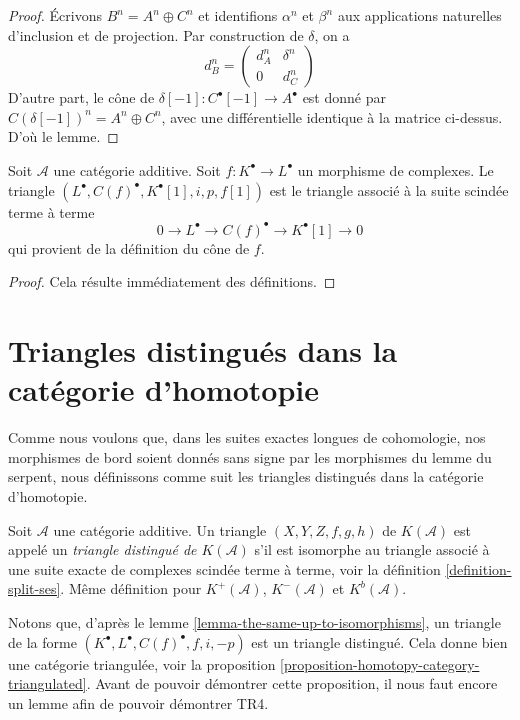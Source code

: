 \begin{proof}
Écrivons $B^n = A^n \oplus C^n$ et identifions $\alpha^n$ et $\beta^n$ aux
applications naturelles d'inclusion et de projection. Par construction de
$\delta$, on a
$$
d_B^n =
\left(
\begin{matrix}
d_A^n & \delta^n \\
0 & d_C^n
\end{matrix}
\right)
$$
D'autre part, le cône de $\delta[-1] : C^\bullet[-1] \to A^\bullet$ est donné
par $C(\delta[-1])^n = A^n \oplus C^n$, avec une différentielle identique à la
matrice ci-dessus. D'où le lemme.
\end{proof}

\begin{lemma}
\label{lemma-rotate-cone}
Soit $\mathcal{A}$ une catégorie additive.
Soit $f : K^\bullet \to L^\bullet$ un morphisme de complexes.
Le triangle $(L^\bullet, C(f)^\bullet, K^\bullet[1], i, p, f[1])$ est le
triangle associé à la suite scindée terme à terme
$$
0 \to L^\bullet \to C(f)^\bullet \to K^\bullet[1] \to 0
$$
qui provient de la définition du cône de $f$.
\end{lemma}

\begin{proof}
Cela résulte immédiatement des définitions.
\end{proof}

\section{Triangles distingués dans la catégorie d'homotopie}
\label{section-homotopy-triangulated}

\noindent
Comme nous voulons que, dans les suites exactes longues de cohomologie, nos
morphismes de bord soient donnés sans signe par les morphismes du lemme du
serpent, nous définissons comme suit les triangles distingués dans la catégorie
d'homotopie.

\begin{definition}
\label{definition-distinguished-triangle}
Soit $\mathcal{A}$ une catégorie additive.
Un triangle $(X, Y, Z, f, g, h)$ de $K(\mathcal{A})$ est appelé un
{\it triangle distingué de $K(\mathcal{A})$} s'il est isomorphe au triangle
associé à une suite exacte de complexes scindée terme à terme, voir la
définition \ref{definition-split-ses}.
Même définition pour $K^{+}(\mathcal{A})$, $K^{-}(\mathcal{A})$ et
$K^b(\mathcal{A})$.
\end{definition}

\noindent
Notons que, d'après le lemme \ref{lemma-the-same-up-to-isomorphisms}, un
triangle de la forme $(K^\bullet, L^\bullet, C(f)^\bullet, f, i, -p)$ est un
triangle distingué. Cela donne bien une catégorie triangulée, voir la
proposition \ref{proposition-homotopy-category-triangulated}. Avant de pouvoir
démontrer cette proposition, il nous faut encore un lemme afin de pouvoir
démontrer TR4.

